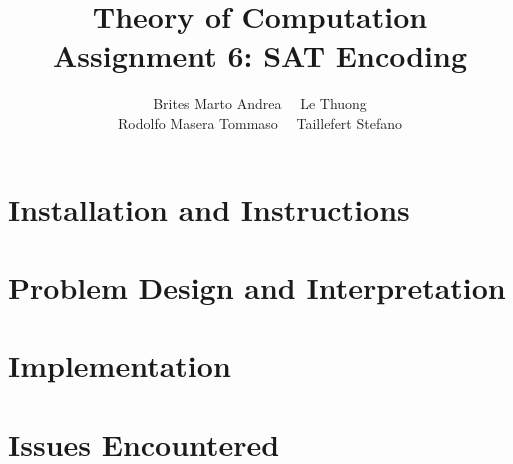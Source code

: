 \documentclass[12pt]{article}
\title{Theory of Computation \\ Assignment 6: SAT Encoding}
\author{Brites Marto Andrea \ \ Le Thuong \\ Rodolfo Masera Tommaso \ \ Taillefert Stefano}
\date{}
\begin{document}
\maketitle

\section{Installation and Instructions}

\section{Problem Design and Interpretation}

\section{Implementation}

\section{Issues Encountered}
\end{document}
